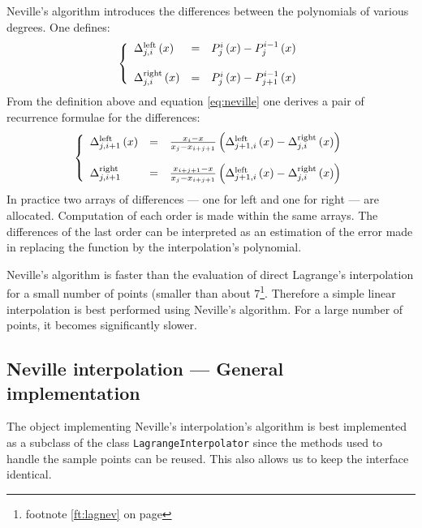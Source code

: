 \documentclass[twoside]{book}
\begin{document}
Neville's algorithm introduces the differences between the
polynomials of various degrees. One defines:
\begin{equation}
\left\{ \begin{array}{lcl} \Delta_{j,i}^{\mathop{\rm
left}}\left(x\right)
&=&P^i_j\left(x\right)-P^{i-1}_j\left(x\right)
\\*[3 ex] \Delta_{j,i}^{\mathop{\rm right}}\left(x\right) &=&P^i_j\left(x\right)-P^{i-1}_{j+1}\left(x\right)
\end{array}\right.
\end{equation}
From the definition above and equation \ref{eq:neville} one
derives a pair of recurrence formulae for the differences:
\begin{equation}
\left\{ \begin{array}{lcl}\Delta_{j,i+1}^{\mathop{\rm
left}}\left(x\right) &=&{x_i-x\over
x_j-x_{i+j+1}}\left(\Delta_{j+1,i}^{\mathop{\rm
left}}\left(x\right)-\Delta_{j,i}^{\mathop{\rm
right}}\left(x\right)\right)
\\*[3 ex] \Delta_{j,i+1}^{\mathop{\rm right}} &=&{x_{i+j+1}-x\over
x_j-x_{i+j+1}}\left(\Delta_{j+1,i}^{\mathop{\rm
left}}\left(x\right)-\Delta_{j,i}^{\mathop{\rm
right}}\left(x\right)\right)
\end{array}\right.
\end{equation}
In practice two arrays of differences --- one for left and one for
right --- are allocated. Computation of each order is made within
the same arrays. The differences of the last order can be
interpreted as an estimation of the error made in replacing the
function by the interpolation's polynomial.

Neville's algorithm is faster than the evaluation of direct
Lagrange's interpolation for a small number of points (smaller
than about 7\footnote{\cf footnote \ref{ft:lagnev} on page
\pageref{ft:lagnev}}. Therefore a simple linear interpolation is
best performed using Neville's algorithm. For a large number of
points, it becomes significantly slower.

\subsection{ Neville interpolation --- General  implementation}
 The object implementing Neville's
interpolation's algorithm is best implemented as a subclass of the
class {\tt LagrangeInterpolator} since the methods used to handle
the sample points can be reused. This also allows us to keep the
interface identical.
\end{document}
